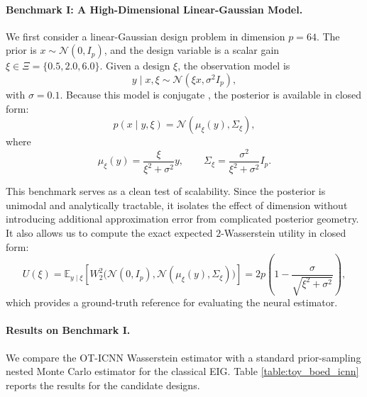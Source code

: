 \documentclass[twoside,11pt]{article}
\begin{document}

\paragraph{Benchmark I: A High-Dimensional Linear-Gaussian Model.} We first consider a linear-Gaussian design problem in dimension $p = 64$. The prior is $x \sim \mathcal{N}(0, I_p)$, and the design variable is a scalar gain $\xi \in \Xi = \{0.5, 2.0, 6.0\}$. Given a design $\xi$, the observation model is
\[
y \mid x, \xi \sim \mathcal{N}(\xi x, \sigma^2 I_p),
\]
with $\sigma = 0.1$. Because this model is conjugate \citep{raiffa2000applied}, the posterior is available in closed form:
\[
p(x \mid y, \xi) = \mathcal{N}(\mu_{\xi}(y), \Sigma_{\xi}),
\]
where
\[
\mu_{\xi}(y) = \frac{\xi}{\xi^2 + \sigma^2} y,
\qquad
\Sigma_{\xi} = \frac{\sigma^2}{\xi^2 + \sigma^2} I_p.
\]

This benchmark serves as a clean test of scalability. Since the posterior is unimodal and analytically tractable, it isolates the effect of dimension without introducing additional approximation error from complicated posterior geometry. It also allows us to compute the exact expected $2$-Wasserstein utility in closed form:
\[
U(\xi) = \mathbb{E}_{y \mid \xi}\!\left[W_2^2\bigl(\mathcal{N}(0, I_p), \mathcal{N}(\mu_{\xi}(y), \Sigma_{\xi})\bigr)\right]
= 2p \left(1 - \frac{\sigma}{\sqrt{\xi^2 + \sigma^2}}\right),
\]
which provides a ground-truth reference for evaluating the neural estimator.

\paragraph{Results on Benchmark I.}
We compare the OT-ICNN Wasserstein estimator with a standard prior-sampling nested Monte Carlo estimator for the classical EIG. Table \ref{table:toy_boed_icnn} reports the results for the candidate designs.
\end{document}
